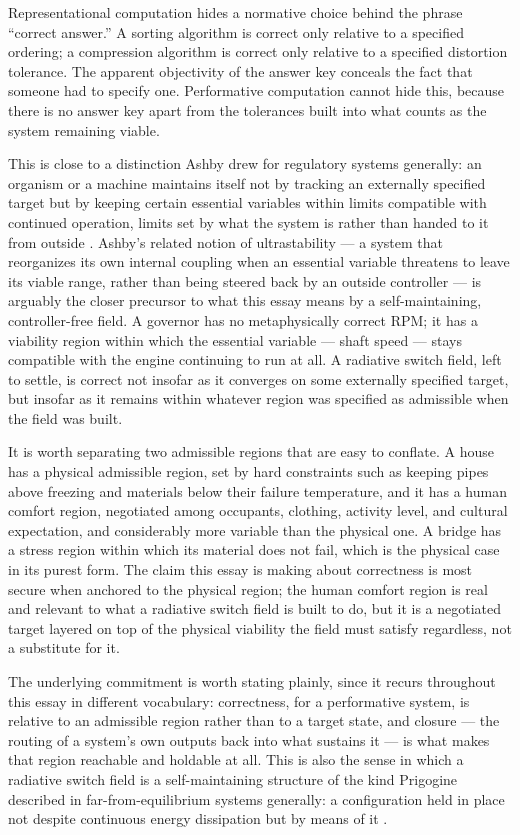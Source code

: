 \documentclass[11pt]{article}
\begin{document}
Representational computation hides a normative choice behind the phrase ``correct answer.'' A sorting algorithm is correct only relative to a specified ordering; a compression algorithm is correct only relative to a specified distortion tolerance. The apparent objectivity of the answer key conceals the fact that someone had to specify one. Performative computation cannot hide this, because there is no answer key apart from the tolerances built into what counts as the system remaining viable.

This is close to a distinction Ashby drew for regulatory systems generally: an organism or a machine maintains itself not by tracking an externally specified target but by keeping certain essential variables within limits compatible with continued operation, limits set by what the system is rather than handed to it from outside \cite{ashby1952,ashby1956}. Ashby's related notion of ultrastability --- a system that reorganizes its own internal coupling when an essential variable threatens to leave its viable range, rather than being steered back by an outside controller --- is arguably the closer precursor to what this essay means by a self-maintaining, controller-free field. A governor has no metaphysically correct RPM; it has a viability region within which the essential variable --- shaft speed --- stays compatible with the engine continuing to run at all. A radiative switch field, left to settle, is correct not insofar as it converges on some externally specified target, but insofar as it remains within whatever region was specified as admissible when the field was built.

It is worth separating two admissible regions that are easy to conflate. A house has a physical admissible region, set by hard constraints such as keeping pipes above freezing and materials below their failure temperature, and it has a human comfort region, negotiated among occupants, clothing, activity level, and cultural expectation, and considerably more variable than the physical one. A bridge has a stress region within which its material does not fail, which is the physical case in its purest form. The claim this essay is making about correctness is most secure when anchored to the physical region; the human comfort region is real and relevant to what a radiative switch field is built to do, but it is a negotiated target layered on top of the physical viability the field must satisfy regardless, not a substitute for it.

The underlying commitment is worth stating plainly, since it recurs throughout this essay in different vocabulary: correctness, for a performative system, is relative to an admissible region rather than to a target state, and closure --- the routing of a system's own outputs back into what sustains it --- is what makes that region reachable and holdable at all. This is also the sense in which a radiative switch field is a self-maintaining structure of the kind Prigogine described in far-from-equilibrium systems generally: a configuration held in place not despite continuous energy dissipation but by means of it \cite{prigogine1977}.
\end{document}
